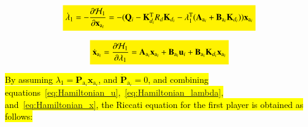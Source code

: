 \documentclass[3p]{elsarticle}
\begin{document}
    \begin{equation}\label{eq:Hamiltonian_lambda}
        \colorbox{yellow}{$\dot{\lambda}_1 = -\dfrac{\partial \mathcal{H}_1}{\partial \mathbf{x}_{\mathrm{a}_i}} = -( \mathbf{Q}_i - 
        \mathbf{K}_{d_i}^\mathrm{T} R_{d} \mathbf{K}_{d_i} -\lambda_1^\mathrm{T}(\mathbf{A}_{\mathrm{a}_i} + \mathbf{B}_{\mathrm{a}_i}\mathbf{K}_{d_i})) \mathbf{x}_{\mathrm{a}_i}$}
    \end{equation}
    
    \begin{equation}\label{eq:Hamiltonian_x}
        \colorbox{yellow}{$\dot{\mathbf{x}}_{\mathrm{a}_i}  = \dfrac{\partial \mathcal{H}_1}{\partial \lambda_1} = \mathbf{A}_{\mathrm{a}_i} \mathbf{x}_{\mathrm{a}_i}  + \mathbf{B}_{\mathrm{a}_i} \mathbf{u}_i + \mathbf{B}_{\mathrm{a}_i} \mathbf{K}_{d_i} \mathbf{x}_{\mathrm{a}_i}$}
    \end{equation}
    
    \hl{By assuming $\lambda_1 = \mathbf{P}_{\mathrm{a}_i}\mathbf{x}_{\mathrm{a}_i}$, 
    and $\dot{\mathbf{P}}_{\mathrm{a}_i} = 0$, and combining equations~{\eqref{eq:Hamiltonian_u}},~{\eqref{eq:Hamiltonian_lambda}}, and~{\eqref{eq:Hamiltonian_x}}, the Riccati equation for the first player is obtained as follows:}
    
\end{document}
